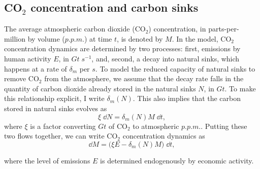 \documentclass[../../main.tex]{subfiles}
\begin{document}
\subsection[Carbon Dioxide concentration]{CO$_2$ concentration and carbon sinks}

The average atmospheric carbon dioxide (CO$_2$) concentration, in parts-per-million by volume ($\unit{p.p.m.}$) at time $t$, is denoted by $M$. In the model, CO$_2$ concentration dynamics are determined by two processes: first, emissions by human activity $E$, in $\unit{Gt} \; \unit{s}^{-1}$, and, second, a decay into natural sinks, which happens at a rate of $\delta_m$ per $\unit{s}$. To model the reduced capacity of natural sinks to remove CO$_2$ from the atmosphere, we assume that the decay rate falls in the quantity of carbon dioxide already stored in the natural sinks $N$, in $\unit{Gt}$. To make this relationship explicit, I write $\delta_m(N)$. This also implies that the carbon stored in natural sinks evolves as \begin{equation}
    \xi \; \dd{N} = \delta_m(N) M \; \dd{t},
\end{equation} where $\xi$ is a factor converting $\unit{Gt}$ of CO$_2$ to atmospheric $\unit{p.p.m.}$. Putting these two flows together, we can write CO$_2$ concentration dynamics as \begin{equation} \label{eq:dynamics:m:emissions}
    \dd{M} = \big(\xi E - \delta_m(N) M \big) \; \dd{t},
\end{equation}

where the level of emissions $E$ is determined endogenously by economic activity. 
\end{document}
